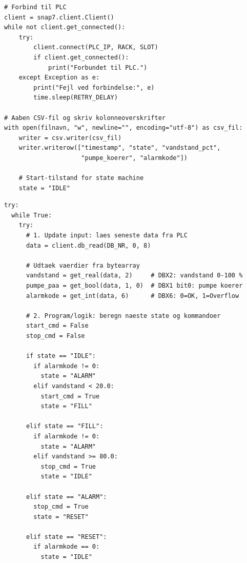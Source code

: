 \documentclass[12pt, a4paper]{article}
\begin{document}
\vspace{0.3cm}

\begin{tcolorbox}[codebox,
  title={\faPython\quad \texttt{vandstand.py} \textnormal{\textcolor{white!60!siemensblue}{\small --- del 2/4: forbind og aaben CSV}}}]
\begin{lstlisting}[style=python, firstnumber=18]
# Forbind til PLC
client = snap7.client.Client()
while not client.get_connected():
    try:
        client.connect(PLC_IP, RACK, SLOT)
        if client.get_connected():
            print("Forbundet til PLC.")
    except Exception as e:
        print("Fejl ved forbindelse:", e)
        time.sleep(RETRY_DELAY)

# Aaben CSV-fil og skriv kolonneoverskrifter
with open(filnavn, "w", newline="", encoding="utf-8") as csv_fil:
    writer = csv.writer(csv_fil)
    writer.writerow(["timestamp", "state", "vandstand_pct",
                     "pumpe_koerer", "alarmkode"])

    # Start-tilstand for state machine
    state = "IDLE"
\end{lstlisting}
\end{tcolorbox}

\vspace{0.3cm}

\begin{tcolorbox}[codebox,
  title={\faPython\quad \texttt{vandstand.py} \textnormal{\textcolor{white!60!siemensblue}{\small --- del 3/4: update input og program/logik}}}]
\begin{lstlisting}[style=python, firstnumber=38]
try:
  while True:
    try:
      # 1. Update input: laes seneste data fra PLC
      data = client.db_read(DB_NR, 0, 8)

      # Udtaek vaerdier fra bytearray
      vandstand = get_real(data, 2)     # DBX2: vandstand 0-100 %
      pumpe_paa = get_bool(data, 1, 0)  # DBX1 bit0: pumpe koerer
      alarmkode = get_int(data, 6)      # DBX6: 0=OK, 1=Overflow

      # 2. Program/logik: beregn naeste state og kommandoer
      start_cmd = False
      stop_cmd = False

      if state == "IDLE":
        if alarmkode != 0:
          state = "ALARM"
        elif vandstand < 20.0:
          start_cmd = True
          state = "FILL"

      elif state == "FILL":
        if alarmkode != 0:
          state = "ALARM"
        elif vandstand >= 80.0:
          stop_cmd = True
          state = "IDLE"

      elif state == "ALARM":
        stop_cmd = True
        state = "RESET"

      elif state == "RESET":
        if alarmkode == 0:
          state = "IDLE"
\end{lstlisting}
\end{tcolorbox}
\end{document}
